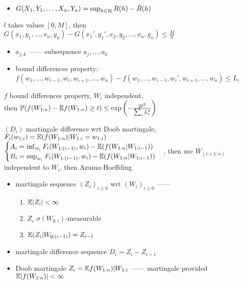 \begin{itemize}
    \item $G(X_1, Y_1, \dots, X_n, Y_n) = \sup_{h \in \mathcal{H}} R(h) - \hat R(h)$
\end{itemize}
\begin{fact}
    $l$ takes values $[0, M]$, then $G(x_1, y_1, \dots, x_n, y_n) - G(x_1', y_1', x_2, y_2, \dots, x_n, y_n)\leq \frac{M}{n}$
\end{fact}

\begin{itemize}
    \item $a_{j:k}$ ------ subsequence $a_j, \dots, a_k$
    \item bound differences property:\\
    $f(w_1, \dots, w_{i-1}, w_i, w_{i+1}, \dots, w_n) - f(w_1, \dots, w_{i-1}, w_i', w_{i+1}, \dots, w_n) \leq L_i$
\end{itemize}

\begin{thm}
    $f$ bound differences property, $W_i$ independent,\\
    then $\mathbb{P}(f(W_{1:n}) - \mathbb{E} f(W_{1:n}) \geq t) \leq \exp \left( - \frac{2t^2}{\sum_i L_i^2} \right)$
\end{thm}
\begin{pf}
    $(D_i)$ martingale difference wrt Doob martingale, $F_i(w_{1:i}) = \mathbb{E}(f(W_{1:n})|W_{1:i} = w_{1:i})$
    $\begin{cases}
         A_i = \inf_{w_i} F_i (W_{1:(i-1)}, w_i) - \mathbb{E}( f(W_{1:n}|W_{1:i-1}))\\
         B_i = \sup_{w_i} F_i (W_{1:(i-1)}, w_i) - \mathbb{E}( f(W_{1:n}|W_{1:i-1}))
    \end{cases}$, then use $W_{(i+1:n)}$ independent to $W_i$, then Azuma-Hoeffding
\end{pf}

\begin{itemize}
    \item martingale sequence $(Z_i)_{i \geq 0}$ wrt $(W_i)_{i \geq 0}$ ------
    \begin{enumerate}
        \item $\mathbb{E}|Z_i| < \infty$
        \item $Z_i$ $\sigma(W_{0:i})$-measurable
        \item $\mathbb{E} (Z_i|W_{0:(i-1)}) = Z_{i-1}$
    \end{enumerate}
    \item martingale difference sequence $D_i = Z_i - Z_{i-1}$
    \item Doob martingale $Z_i = \mathbb{E} f(W_{1:n}) | W_{1:i}$ ------ martingale provided $\mathbb{E} |f(W_{1:n})| < \infty$
\end{itemize}

